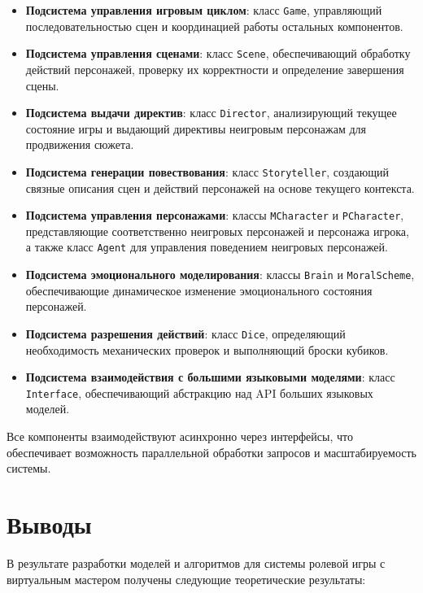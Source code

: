 \begin{itemize}
	\item \textbf{Подсистема управления игровым циклом}: класс \texttt{Game}, управляющий последовательностью сцен и координацией работы остальных компонентов.
	
	\item \textbf{Подсистема управления сценами}: класс \texttt{Scene}, обеспечивающий обработку действий персонажей, проверку их корректности и определение завершения сцены.
	
	\item \textbf{Подсистема выдачи директив}: класс \texttt{Director}, анализирующий текущее состояние игры и выдающий директивы неигровым персонажам для продвижения сюжета.
	
	\item \textbf{Подсистема генерации повествования}: класс \texttt{Storyteller}, создающий связные описания сцен и действий персонажей на основе текущего контекста.
	
	\item \textbf{Подсистема управления персонажами}: классы \texttt{MCharacter} и \texttt{PCharacter}, представляющие соответственно неигровых персонажей и персонажа игрока, а также класс \texttt{Agent} для управления поведением неигровых персонажей.
	
	\item \textbf{Подсистема эмоционального моделирования}: классы \texttt{Brain} и \texttt{MoralScheme}, обеспечивающие динамическое изменение эмоционального состояния персонажей.
	
	\item \textbf{Подсистема разрешения действий}: класс \texttt{Dice}, определяющий необходимость механических проверок и выполняющий броски кубиков.
	
	\item \textbf{Подсистема взаимодействия с большими языковыми моделями}: класс \texttt{Interface}, обеспечивающий абстракцию над API больших языковых моделей.
\end{itemize}

Все компоненты взаимодействуют асинхронно через интерфейсы, что обеспечивает возможность параллельной обработки запросов и масштабируемость системы.

\section{Выводы}

В результате разработки моделей и алгоритмов для системы ролевой игры с виртуальным мастером получены следующие теоретические результаты:

